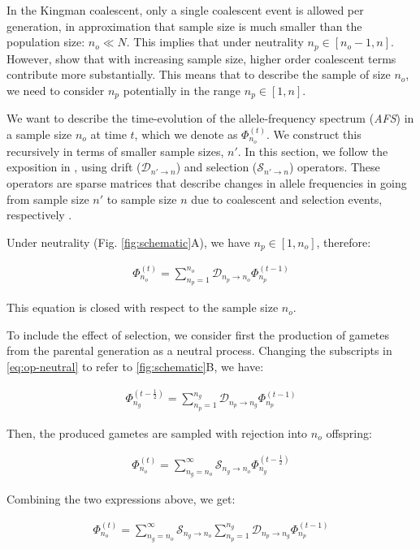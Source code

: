 \documentclass[review]{elsarticle}
\newcommand{\ra}{\rightarrow}
\newcommand{\afs}[2]{\Phi_{#1}^{(#2)}}
\begin{document}
In the Kingman coalescent, only a single coalescent event is allowed per generation, in
approximation that sample size is much smaller than the population size: $n_o \ll N$. This implies
that under neutrality $n_p \in [n_o-1, n]$. However, \citet{BhaskarEtAl2014} show that with
increasing sample size, higher order coalescent terms contribute more substantially. This means that
to describe the sample of size $n_o$, we need to consider $n_p$ potentially in the range
$n_p \in [1, n]$. 

We want to describe the time-evolution of the allele-frequency spectrum (\textit{AFS}) in a sample
size $n_o$ at time $t$, which we denote as $\afs{n_o}{t}$. We construct this recursively in terms of
smaller sample sizes, $n'$. In this section, we follow the exposition in \citet{JouganousEtAl2017},
using drift ($\mathcal{D}_{n' \ra n}$) and selection ($\mathcal{S}_{n' \ra n}$) operators. These
operators are sparse matrices that describe changes in allele frequencies in going from sample size
$n'$ to sample size $n$ due to coalescent and selection events, respectively \citep{JouganousEtAl2017}.

Under neutrality (Fig. \ref{fig:schematic}A), we have $n_p \in [1, n_o]$, therefore:

\begin{align}
  \label{eq:op-neutral}
  \afs{n_o}{t} = \sum_{n_p=1}^{n_o}\mathcal{D}_{n_p\ra n_o} \afs{n_p}{t-1}
\end{align}

This equation is closed with respect to the sample size $n_o$. 

To include the effect of selection, we consider first the production of gametes from the parental
generation as a neutral process. Changing the subscripts in \eqref{eq:op-neutral} to refer to
\ref{fig:schematic}B, we have:

\begin{align*}
  \afs{n_g}{t-\frac{1}{2}} = \sum_{n_p=1}^{n_g}\mathcal{D}_{n_p\ra n_g} \afs{n_p}{t-1}
\end{align*}

Then, the produced gametes are sampled with rejection into $n_o$ offspring:

\begin{align*}
  \afs{n_o}{t} = \sum_{n_g=n_o}^{\infty}\mathcal{S}_{n_g\ra n_o} \afs{n_g}{t-\frac{1}{2}}
\end{align*}

Combining the two expressions above, we get:

\begin{align}
  \label{eq:op-selection}
  \afs{n_o}{t} = \sum_{n_g=n_o}^{\infty} \mathcal{S}_{n_g\ra n_o} \sum_{n_p=1}^{n_g} \mathcal{D}_{n_p\ra n_g} \afs{n_p}{t-1}
\end{align}
\end{document}
